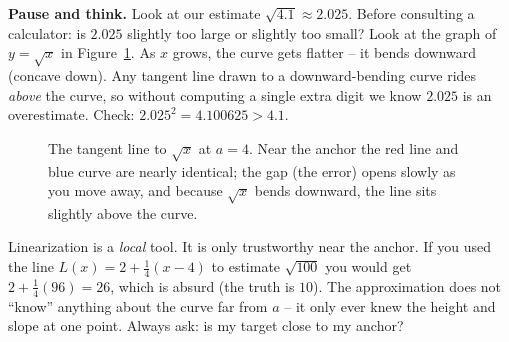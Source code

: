 \begin{recoverybox}
\textbf{Pause and think.} Look at our estimate $\sqrt{4.1} \approx 2.025$. Before
consulting a calculator: is $2.025$ slightly too large or slightly too small?
Look at the graph of $y=\sqrt{x}$ in Figure~\ref{ch14:fig-sqrt}. As $x$ grows,
the curve gets flatter -- it bends downward (concave down). Any tangent line
drawn to a downward-bending curve rides \emph{above} the curve, so without
computing a single extra digit we know $2.025$ is an overestimate. Check:
$2.025^2 = 4.100625 > 4.1$.
\end{recoverybox}

\begin{figure}[H]
\centering
{}
\caption{The tangent line to $\sqrt{x}$ at $a=4$. Near the anchor the red line
and blue curve are nearly identical; the gap (the error) opens slowly as you move
away, and because $\sqrt{x}$ bends downward, the line sits slightly above the
curve.}
\label{ch14:fig-sqrt}
\end{figure}

\begin{trapbox}
Linearization is a \emph{local} tool. It is only trustworthy near the anchor. If
you used the line $L(x)=2+\tfrac14(x-4)$ to estimate $\sqrt{100}$ you would get
$2+\tfrac14(96)=26$, which is absurd (the truth is $10$). The approximation does
not ``know'' anything about the curve far from $a$ -- it only ever knew the height
and slope at one point. Always ask: is my target close to my anchor?
\end{trapbox}

